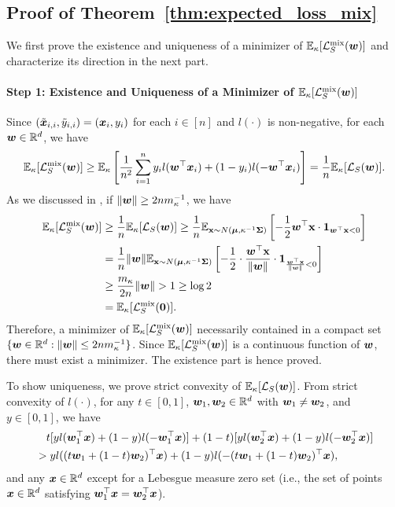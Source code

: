 \subsection{Proof of Theorem~\ref{thm:expected_loss_mix}}\label{proof:expected_loss_mix}
We first prove the existence and uniqueness of a minimizer of $\mathbb{E}_\kappa[\mathcal{L}_S^\mathrm{mix}({\bm{w}})]$ and characterize its direction in the next part.
\paragraph{Step 1: Existence and Uniqueness of a Minimizer of $\mathbb{E}_\kappa[\mathcal{L}_S^\mathrm{mix}({\bm{w}})]$} \quad

Since $(\tilde{{\bm{x}}}_{i,i}, \tilde{y}_{i,i}) = ({\bm{x}}_i, y_i)$ for each $i \in [n]$ and $l(\cdot)$ is non-negative, for each ${\bm{w}} \in \mathbb{R}^d$, we have
\begin{equation*}
    \mathbb{E}_\kappa[\mathcal{L}_S^\mathrm{mix}({\bm{w}})]  \geq \mathbb{E}_\kappa \left[ \frac{1}{n^2} \sum_{i=1}^n y_i l({\bm{w}}^\top {\bm{x}}_i) + (1-y_i) l(-{\bm{w}}^\top {\bm{x}}_i)\right] = \frac{1}{n} \mathbb{E}_\kappa[\mathcal{L}_S({\bm{w}})].
\end{equation*}
As we discussed in , if $\lVert {\bm{w}} \rVert \geq 2 n m_\kappa^{-1}$, we have
\begin{align*}
\mathbb{E}_\kappa[\mathcal{L}_S^\mathrm{mix} ({\bm{w}})] &\geq \frac{1}{n} \mathbb{E}_\kappa[\mathcal{L}_S ({\bm{w}})] \geq \frac{1}{n} \mathbb{E}_{{\mathbf{x}} \sim N({\bm{\mu}}, \kappa^{-1} {\bm{\Sigma}})} \left[- \frac{1}{2} {\bm{w}}^\top {\mathbf{x}} \cdot {\bm{1}}_{{\bm{w}}^\top {\mathbf{x}} <0} \right]\\
&= \frac{1}{n} \lVert {\bm{w}} \rVert \mathbb{E}_{{\mathbf{x}} \sim N({\bm{\mu}}, \kappa^{-1}{\bm{\Sigma}})}\left[- \frac{1}{2} \cdot \frac{{\bm{w}}^\top {\mathbf{x}}}{\lVert {\bm{w}} \rVert} \cdot {\bm{1}}_{\frac{{\bm{w}}^\top {\mathbf{x}}}{\lVert {\bm{w}} \rVert}<0} \right]\\
&\geq \frac{m_\kappa}{2n} \lVert {\bm{w}} \rVert > 1 \geq \log 2 \\
&= \mathbb{E}_\kappa [\mathcal{L}_S^\mathrm{mix} ({\bm{0}})].
\end{align*}
Therefore, a minimizer of $\mathbb{E}_\kappa [ \mathcal{L}_S^\mathrm{mix} ({\bm{w}}) ]$ necessarily contained in a compact set $\{ {\bm{w}} \in \mathbb{R}^d :  \lVert {\bm{w}} \rVert \leq 2 n m_\kappa^{-1} \}$. Since $\mathbb{E}_\kappa [ \mathcal{L}_S^\mathrm{mix} ({\bm{w}}) ]$ is a continuous function of ${\bm{w}}$, there must exist a minimizer. The existence part is hence proved.

To show uniqueness, we prove strict convexity of $\mathbb{E}_\kappa[\mathcal{L}_S ({\bm{w}})]$. From strict convexity of $l(\cdot)$, for any $t \in [0,1]$, ${\bm{w}}_1, {\bm{w}}_2 \in \mathbb{R}^d$ with ${\bm{w}}_1 \neq {\bm{w}}_2$, and $y \in [0,1]$, we have
\begin{align*}
    &\quad t[yl({\bm{w}}_1^\top {\bm{x}}) + (1-y) l(-{\bm{w}}_1^\top {\bm{x}})] + (1-t) [yl({\bm{w}}_2^\top {\bm{x}}) + (1-y) l(-{\bm{w}}_2^\top {\bm{x}})]\\
    &> y l((t{\bm{w}}_1+(1-t){\bm{w}}_2)^\top {\bm{x}}) + (1-y) l(-(t{\bm{w}}_1+(1-t){\bm{w}}_2)^\top {\bm{x}}),
\end{align*}
and any ${\bm{x}} \in \mathbb{R}^d$ except for a Lebesgue measure zero set (i.e., the set of points ${\bm{x}} \in \mathbb{R}^d$ satisfying  ${\bm{w}}_1^\top {\bm{x}} = {\bm{w}}_2^\top {\bm{x}}$).

